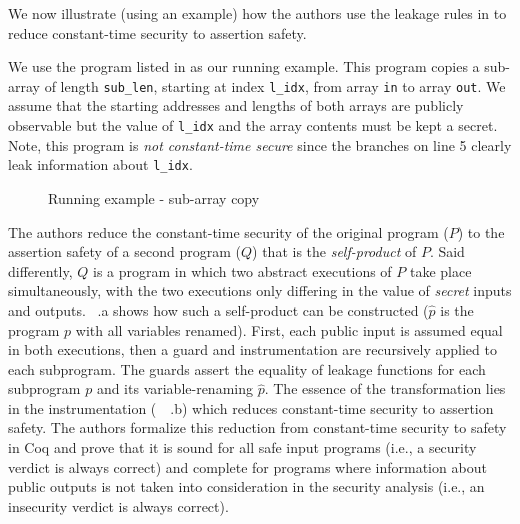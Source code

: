 
We now illustrate (using an example) how the authors use the leakage rules in  
to reduce constant-time security to assertion safety.

We use the program listed in  as our running example. 
This program copies a sub-array of length \texttt{sub\_len}, starting at index \texttt{l\_idx}, from array \texttt{in}
to array \texttt{out}.
We assume that the starting addresses and lengths of both arrays are publicly observable but the value of \texttt{l\_idx} and the array contents must be kept a secret.
Note, this program is \emph{not constant-time secure} since the branches on line 5 clearly leak information about \texttt{l\_idx}.

\begin{figure}[h]
    
    \caption{Running example - sub-array copy}
    \label{fig:example}
\end{figure}


The authors reduce the constant-time security of the original program ($P$) to the assertion safety of a second program ($Q$) that is the \emph{self-product} of $P$.
Said differently, $Q$ is a program in which two abstract executions of $P$ take place simultaneously, with the two executions only differing in the value of \emph{secret} inputs and outputs. 
~.a shows how such a self-product can be constructed ($\hat{p}$ is the program $p$ with all variables renamed).
First, each public input is assumed equal in both executions, then a guard and instrumentation are recursively applied to each subprogram. 
The guards assert the equality of leakage functions for each subprogram $p$ and its variable-renaming $\hat{p}$.
The essence of the transformation lies in the instrumentation (~~.b) which reduces constant-time security to assertion safety. 
The authors formalize this reduction from constant-time security to safety in Coq and prove that it is sound for all safe input programs (i.e., a security verdict is always correct) and complete for programs where information about public outputs is not taken into consideration in the security analysis (i.e., an insecurity verdict is always correct).

